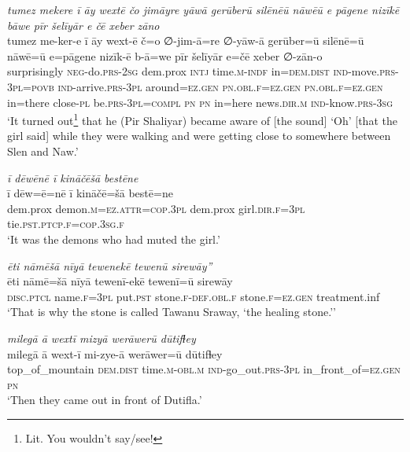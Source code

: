 \ea \label{ŽP.175}
\textit{tumez mekere ī āy wextē čo jimāyre yāwā gerūberū silēnēū nāwēū e pāgene nizīkē bāwe pīr šelīyār e čē xeber zāno} \\ 
\gll tumez me-ker-e ī āy wext-ē č=o ∅-jim-ā=re ∅-yāw-ā gerūber=ū silēnē=ū nāwē=ū e=pāgene nizīk-ē b-ā=we pīr šelīyār e=čē xeber ∅-zān-o \\ 
 surprisingly \textsc{neg-}do\textsc{.prs}-\textsc{2sg} dem.prox \textsc{intj} time\textsc{.m}\textsc{-indf} in=\textsc{dem.dist} \textsc{ind-}move\textsc{.prs}\textsc{-3pl}\textsc{=\textsc{povb}} \textsc{ind-}arrive\textsc{.prs}\textsc{-3pl} around\textsc{\textsc{=ez.gen}} \textsc{pn}\textsc{.obl}\textsc{.f}\textsc{\textsc{=ez.gen}} \textsc{pn}\textsc{.obl}\textsc{.f}\textsc{\textsc{=ez.gen}} in=there close\textsc{\textsc{-pl}} be\textsc{.prs}\textsc{-3pl}\textsc{=compl} \textsc{pn} \textsc{pn} in=here news\textsc{.dir}\textsc{.m} \textsc{ind-}know\textsc{.prs}\textsc{-3sg} \\ 
\glt `It turned out\footnote{Lit. You wouldn’t say/see!} that he (Pir Shaliyar) became aware of [the sound] ‘Oh’ [that the girl said] while they were walking and were getting close to somewhere between Slen and Naw.'
\z 
 
\ea \label{ŽP.177}
\textit{ī dēwēnē ī kināčēšā bestēne} \\ 
\gll ī dēw=ē=nē ī kināčē=šā bestē=ne \\ 
 dem.prox demon\textsc{.m}\textsc{=ez}.\textsc{attr}\textsc{=cop}\textsc{.3pl} dem.prox girl\textsc{.dir}\textsc{.f}\textsc{=3pl} tie\textsc{.pst}\textsc{.ptcp}\textsc{.f}\textsc{=cop}\textsc{.3sg}\textsc{.f} \\ 
\glt `It was the demons who had muted the girl.'
\z 
 
\ea \label{ŽP.185}
\textit{ēti nāmēšā nīyā tewenekē tewenū sirewāy”} \\ 
\gll ēti nāmē=šā nīyā tewenī-ekē tewenī=ū sirewāy \\ 
 \textsc{disc.ptcl} name\textsc{.f}\textsc{=3pl} put\textsc{.pst} stone\textsc{.f}\textsc{-def}\textsc{.obl}\textsc{.f} stone\textsc{.f}\textsc{\textsc{=ez.gen}} treatment.inf \\ 
\glt `That is why the stone is called Tawanu Sraway, ‘the healing stone.’'
\z 
 
\ea \label{ŽP.187}
\textit{milegā ā wextī mizyā werāwerū dūtifɫey} \\ 
\gll milegā ā wext-ī mi-zye-ā werāwer=ū dūtifɫey \\ 
 top\_of\_mountain \textsc{dem.dist} time\textsc{.m}\textsc{-obl}\textsc{.m} \textsc{ind-}go\_out\textsc{.prs}\textsc{-3pl} in\_front\_of\textsc{\textsc{=ez.gen}} \textsc{pn} \\ 
\glt `Then they came out in front of  Dutifla.'
\z 
 
